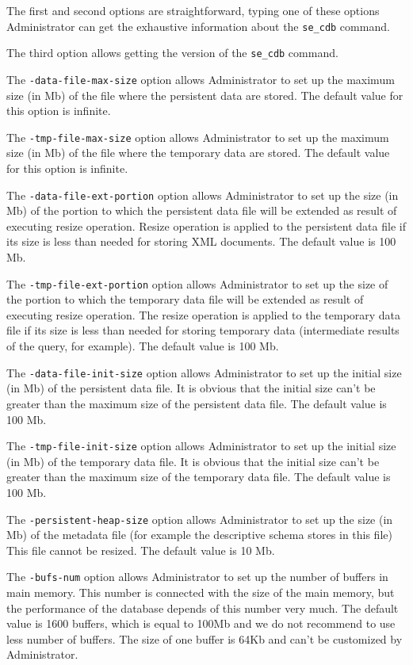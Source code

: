 \documentclass[a4paper,12pt]{article}
\begin{document}
The first and second options are straightforward, typing one of these options Administrator can get the exhaustive information about the \verb!se_cdb! command.

The third option allows getting the version of the \verb!se_cdb! command.

The \verb!-data-file-max-size! option allows Administrator to set up the maximum size (in Mb) of the file where the persistent data are stored. The default value for this option is infinite.

The \verb!-tmp-file-max-size! option allows Administrator to set up the maximum size (in Mb) of the file where the temporary data are stored. The default value for this option is infinite.

The \verb!-data-file-ext-portion! option allows Administrator to set up the size (in Mb) of the portion to which the persistent data file will be extended as result of executing resize operation. Resize operation is applied to the persistent data file if its size is less than needed for storing XML documents. The default value is 100 Mb.

The \verb!-tmp-file-ext-portion! option allows Administrator to set up the size of the portion to which the temporary data file will be extended as result of executing resize operation. The resize operation is applied to the temporary data file if its size is less than needed for storing temporary data (intermediate results of the query, for example). The default value is 100 Mb.

The \verb!-data-file-init-size! option allows Administrator to set up the initial size (in Mb) of the persistent data file. It is obvious that the initial size can't be greater than the maximum size of the persistent data file. The default value is 100 Mb.

The \verb!-tmp-file-init-size! option allows Administrator to set up the initial size (in Mb) of the temporary data file. It is obvious that the initial size can't be greater than the maximum size of the temporary data file. The default value is 100 Mb.

The \verb!-persistent-heap-size! option allows Administrator to set up the size (in Mb) of the metadata file (for example the descriptive schema stores in this file) This file cannot be resized. The default value is 10 Mb.

The \verb!-bufs-num! option allows Administrator to set up the number of buffers in main memory. This number is connected with the size of the main memory, but the performance of the database depends of this number very much. The default value is 1600 buffers, which is equal to 100Mb and we do not recommend to use less number of buffers. The size of one buffer is 64Kb and can't be customized by Administrator.
\end{document}
